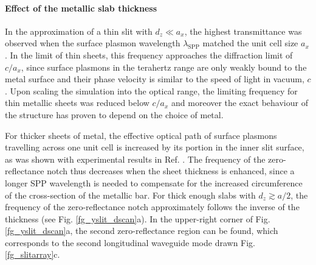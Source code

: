 \paragraph{Effect of the metallic slab thickness}%

In the approximation of a thin slit with $d_z \ll a_x$, the highest transmittance was observed when the surface plasmon wavelength $\lambda_{\text{SPP}}$ matched the unit cell size $a_x$. 
In the limit of thin sheets, this frequency approaches the diffraction limit of $c/a_x$, since surface plasmons in the terahertz range are only weakly bound to the metal surface and their phase velocity is similar to the speed of light in vacuum, $c$. Upon scaling the simulation into the optical range, the limiting frequency for thin metallic sheets was reduced below $c/a_x$ and moreover the exact behaviour of the structure has proven to depend on the choice of metal.

For thicker sheets of metal, the effective optical path of surface plasmons travelling across one unit cell is increased by its portion in the inner slit surface, as was shown with experimental results in Ref. \cite{weiner2011electromagnetics}. The frequency of the zero-reflectance notch thus decreases when the sheet thickness is enhanced, since a longer SPP wavelength is needed to compensate for the increased circumference of the cross-section of the metallic bar. 
For thick enough slabs with $d_z \gtrsim a/2$, the frequency of the zero-reflectance notch approximately follows the inverse of the thickness (see Fig. \ref{fg_yslit_dscan}a). 
In the upper-right corner of Fig. \ref{fg_yslit_dscan}a, the second zero-reflectance region can be found, which corresponds to the second longitudinal waveguide mode drawn Fig. \ref{fg_slitarray}c. %

